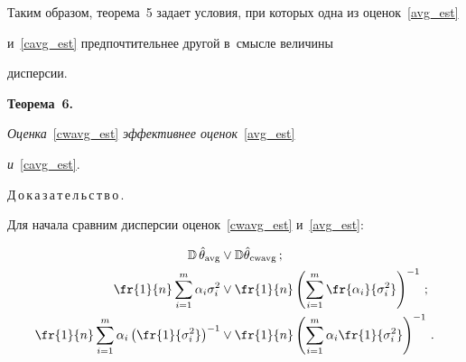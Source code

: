 Таким образом, теорема~5 задает условия, при которых одна из оценок~\eqref{avg_est} 


и~\eqref{cavg_est} предпочтительнее другой в~смысле величины 


дисперсии.








\vspace*{2pt}





\noindent


\textbf{Теорема~6.}\ 


\textit{Оценка}~\eqref{cwavg_est} \textit{эффективнее оценок}~\eqref{avg_est} 


\textit{и}~\eqref{cavg_est}.





\vspace*{2pt}





\noindent


Д\,о\,к\,а\,з\,а\,т\,е\,л\,ь\,с\,т\,в\,о\,.\ \ 


Для начала сравним дисперсии оценок~\eqref{cwavg_est} и~\eqref{avg_est}:





\vspace*{-1pt}





\noindent


\begin{align*}


\mathbb{D}\,\hat{\theta}_{\mathrm{avg}} &\vee \mathbb{D}\hat{\theta}_{\mathrm{cwavg}}\,; \\


\fr{1}{n}\sum\limits_{i=1}^m \alpha_i\sigma_i^2 &\vee \fr{1}{n} 


\left(\sum\limits_{i=1}^m\fr{\alpha_i}{\sigma_i^2}\right)^{-1}\,; \\


\fr{1}{n}\sum\limits_{i=1}^m \alpha_i\left(\fr{1}{\sigma_i^2}\right)^{-1} 


&\vee \fr{1}{n} \left(\sum\limits_{i=1}^m 


\alpha_i\fr{1}{\sigma_i^2}\right)^{-1}\,.


\end{align*}


